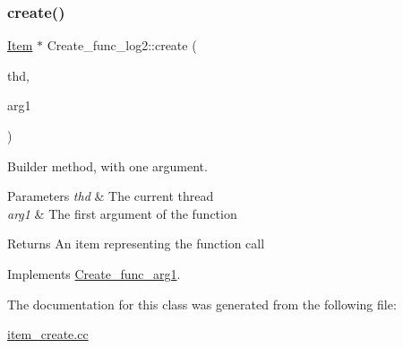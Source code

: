 \subsubsection{\texorpdfstring{create()}{create()}}
{\footnotesize\ttfamily \mbox{\hyperlink{classItem}{Item}} $\ast$ Create\+\_\+func\+\_\+log2\+::create (\begin{DoxyParamCaption}\item[{T\+HD $\ast$}]{thd,  }\item[{\mbox{\hyperlink{classItem}{Item}} $\ast$}]{arg1 }\end{DoxyParamCaption})\hspace{0.3cm}{\ttfamily [virtual]}}

Builder method, with one argument. 
\begin{DoxyParams}{Parameters}
{\em thd} & The current thread \\
\hline
{\em arg1} & The first argument of the function \\
\hline
\end{DoxyParams}
\begin{DoxyReturn}{Returns}
An item representing the function call 
\end{DoxyReturn}


Implements \mbox{\hyperlink{classCreate__func__arg1_a3e9a98f755cd82c3e762e334c955a8c9}{Create\+\_\+func\+\_\+arg1}}.



The documentation for this class was generated from the following file\+:\begin{DoxyCompactItemize}
\item 
\mbox{\hyperlink{item__create_8cc}{item\+\_\+create.\+cc}}\end{DoxyCompactItemize}
